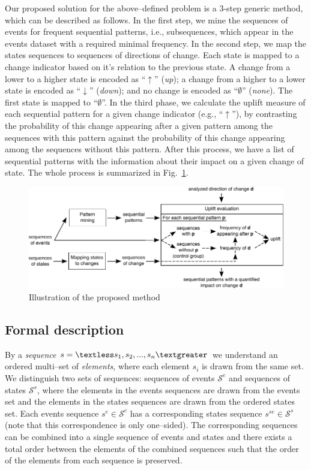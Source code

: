 \documentclass[runningheads,a4paper]{llncs}
\begin{document}
Our proposed solution for the above--defined problem is a 3-step generic method, which can be described as follows.
In the first step, we mine the sequences of events for frequent sequential patterns, i.e., subsequences, which appear in the events dataset with a required minimal frequency.
In the second step, we map the states sequences to sequences of directions of change.
Each state is mapped to a change indicator based on it's relation to the previous state.
A change from a lower to a higher state is encoded as ``$\uparrow$'' (\textit{up}); a change from a higher to a lower state is encoded as ``$\downarrow$'' (\textit{down}); and no change is encoded as ``$\emptyset$'' (\textit{none}).
The first state is mapped to ``$\emptyset$''.
In the third phase, we calculate the uplift measure of each sequential pattern for a given change indicator (e.g., ``$\uparrow$''), by contrasting the probability of this change appearing after a given pattern among the sequences with this pattern against the probability of this change appearing among the sequences without this pattern.
After this process, we have a list of sequential patterns with the information about their impact on a given change of state.
The whole process is summarized in Fig.~\ref{fig:concept}.

\begin{figure}[!ht]
	\centering
		\includegraphics[width=\textwidth]{images/concept}
	\caption{Illustration of the proposed method}
	\label{fig:concept}
\end{figure}

\subsection{Formal description}
By a \textit{sequence} $s=\textless s_1, s_2, ..., s_n\textgreater$ we understand an ordered multi--set of \textit{elements}, where each element $s_i$ is drawn from the same set.
We distinguish two sets of sequences: sequences of events $\mathcal{S}^e$ and sequences of states $\mathcal{S}^s$, where the elements in the events sequences are drawn from the events set and the elements in the states sequences are drawn from the ordered states set.
Each events sequence $s^e\in\mathcal{S}^e$ has a corresponding states sequence $s^{se}\in\mathcal{S}^s$ (note that this correspondence is only one--sided).
The corresponding sequences can be combined into a single sequence of events and states and there exists a total order between the elements of the combined sequences such that the order of the elements from each sequence is preserved.
\end{document}
